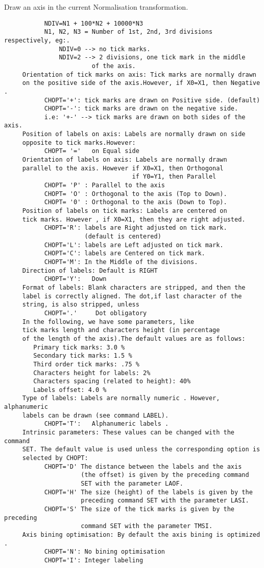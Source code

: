    \par
Draw an axis in the current Normalisation transformation.  
\begin{verbatim}
           NDIV=N1 + 100*N2 + 10000*N3
           N1, N2, N3 = Number of 1st, 2nd, 3rd divisions respectively, eg:.
               NDIV=0 --> no tick marks.
               NDIV=2 --> 2 divisions, one tick mark in the middle
                        of the axis.
     Orientation of tick marks on axis: Tick marks are normally drawn
     on the positive side of the axis.However, if X0=X1, then Negative .
           CHOPT='+': tick marks are drawn on Positive side. (default)
           CHOPT='-': tick marks are drawn on the negative side.
           i.e: '+-' --> tick marks are drawn on both sides of the axis.
     Position of labels on axis: Labels are normally drawn on side
     opposite to tick marks.However:
           CHOPT= '='   on Equal side
     Orientation of labels on axis: Labels are normally drawn
     parallel to the axis. However if X0=X1, then Orthogonal
                                   if Y0=Y1, then Parallel
           CHOPT= 'P' : Parallel to the axis
           CHOPT= 'O' : Orthogonal to the axis (Top to Down).
           CHOPT= '0' : Orthogonal to the axis (Down to Top).
     Position of labels on tick marks: Labels are centered on
     tick marks. However , if X0=X1, then they are right adjusted.
           CHOPT='R': labels are Right adjusted on tick mark.
                      (default is centered)
           CHOPT='L': labels are Left adjusted on tick mark.
           CHOPT='C': labels are Centered on tick mark.
           CHOPT='M': In the Middle of the divisions.
     Direction of labels: Default is RIGHT
           CHOPT='Y':   Down
     Format of labels: Blank characters are stripped, and then the
     label is correctly aligned. The dot,if last character of the
     string, is also stripped, unless
           CHOPT='.'     Dot obligatory
     In the following, we have some parameters, like
     tick marks length and characters height (in percentage
     of the length of the axis).The default values are as follows:
        Primary tick marks: 3.0 %
        Secondary tick marks: 1.5 %
        Third order tick marks: .75 %
        Characters height for labels: 2%
        Characters spacing (related to height): 40%
        Labels offset: 4.0 %
     Type of labels: Labels are normally numeric . However, alphanumeric
     labels can be drawn (see command LABEL).
           CHOPT='T':   Alphanumeric labels .
     Intrinsic parameters: These values can be changed with the command
     SET. The default value is used unless the corresponding option is
     selected by CHOPT:
           CHOPT='D' The distance between the labels and the axis
                     (the offset) is given by the preceding command
                     SET with the parameter LAOF.
           CHOPT='H' The size (height) of the labels is given by the
                     preceding command SET with the parameter LASI.
           CHOPT='S' The size of the tick marks is given by the preceding
                     command SET with the parameter TMSI.
     Axis bining optimisation: By default the axis bining is optimized .
           CHOPT='N': No bining optimisation
           CHOPT='I': Integer labeling
\end{verbatim}
